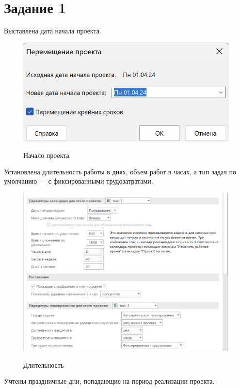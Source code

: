 \section{Задание 1}

Выставлена дата начала проекта.

\begin{figure}[ht!]
	\includegraphics[width=0.75\linewidth]{assets/images/1-start.png}
	\label{fig:r2}
	\caption{Начало проекта}
\end{figure}
\FloatBarrier

Установлена длительность работы в днях, объем работ в часах, а тип задач по умолчанию --- с фиксированными трудозатратами.

\begin{figure}[ht!]
	\includegraphics[width=0.75\linewidth]{assets/images/1-long.png}
	\label{fig:r2}
	\caption{Длительность}
\end{figure}
\FloatBarrier

Учтены праздничные дни, попадающие на период реализации проекта.


